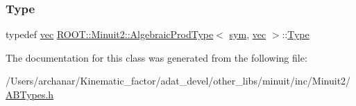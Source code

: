 \mbox{\label{classROOT_1_1Minuit2_1_1AlgebraicProdType_3_01sym_00_01vec_01_4_ad796e20c26ea6b960299e66820ca3c2c}} 
\subsubsection{\texorpdfstring{Type}{Type}\hspace{0.1cm}{\footnotesize\ttfamily [2/2]}}
{\footnotesize\ttfamily typedef \mbox{\hyperlink{classROOT_1_1Minuit2_1_1vec}{vec}} \mbox{\hyperlink{classROOT_1_1Minuit2_1_1AlgebraicProdType}{R\+O\+O\+T\+::\+Minuit2\+::\+Algebraic\+Prod\+Type}}$<$ \mbox{\hyperlink{classROOT_1_1Minuit2_1_1sym}{sym}}, \mbox{\hyperlink{classROOT_1_1Minuit2_1_1vec}{vec}} $>$\+::\mbox{\hyperlink{classROOT_1_1Minuit2_1_1AlgebraicProdType_3_01sym_00_01vec_01_4_ad796e20c26ea6b960299e66820ca3c2c}{Type}}}



The documentation for this class was generated from the following file\+:\begin{DoxyCompactItemize}
\item 
/\+Users/archanar/\+Kinematic\+\_\+factor/adat\+\_\+devel/other\+\_\+libs/minuit/inc/\+Minuit2/\mbox{\hyperlink{other__libs_2minuit_2inc_2Minuit2_2ABTypes_8h}{A\+B\+Types.\+h}}\end{DoxyCompactItemize}
